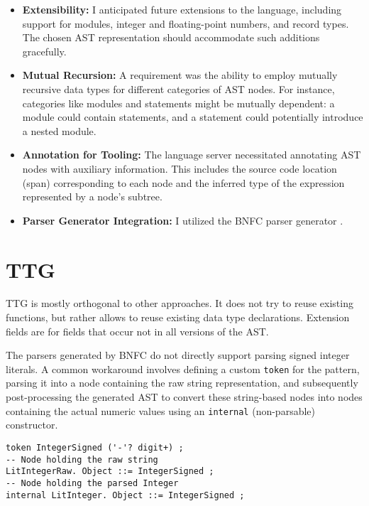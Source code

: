 \begin{itemize}
  \item \textbf{Extensibility:} I anticipated future extensions to the language, including support for modules, integer and floating-point numbers, and record types. The chosen AST representation should accommodate such additions gracefully.
  \item \textbf{Mutual Recursion:} A requirement was the ability to employ mutually recursive data types for different categories of AST nodes. For instance, categories like modules and statements might be mutually dependent: a module could contain statements, and a statement could potentially introduce a nested module.
  \item \textbf{Annotation for Tooling:} The language server necessitated annotating AST nodes with auxiliary information. This includes the source code location (span) corresponding to each node and the inferred type of the expression represented by a node's subtree.
  \item \textbf{Parser Generator Integration:} I utilized the BNFC parser generator \cite{bnfc-site-2025}.
\end{itemize}




\section{TTG}

TTG is mostly orthogonal to other approaches.
It does not try to reuse existing functions, but rather allows to reuse existing data type declarations.
Extension fields are for fields that occur not in all versions of the AST.



The parsers generated by BNFC do not directly support parsing signed integer literals. A common workaround involves defining a custom \texttt{token} for the pattern, parsing it into a node containing the raw string representation, and subsequently post-processing the generated AST to convert these string-based nodes into nodes containing the actual numeric values using an \texttt{internal} (non-parsable) constructor.

\begin{verbatim}
token IntegerSigned ('-'? digit+) ;
-- Node holding the raw string
LitIntegerRaw. Object ::= IntegerSigned ;
-- Node holding the parsed Integer
internal LitInteger. Object ::= IntegerSigned ;
\end{verbatim}

